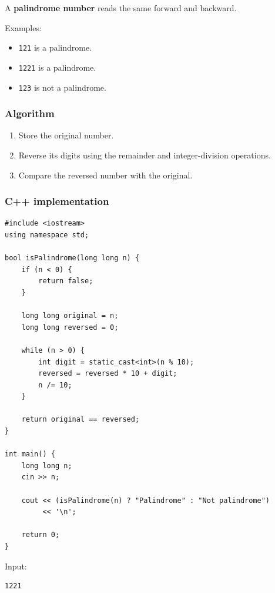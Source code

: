 A \textbf{palindrome number} reads the same forward and backward.

Examples:

\begin{itemize}
    \item \texttt{121} is a palindrome.
    \item \texttt{1221} is a palindrome.
    \item \texttt{123} is not a palindrome.
\end{itemize}

\subsubsection{Algorithm}

\begin{enumerate}
    \item Store the original number.
    \item Reverse its digits using the remainder and integer-division operations.
    \item Compare the reversed number with the original.
\end{enumerate}

\subsubsection{C++ implementation}

\begin{lstlisting}[style=cppstyle]
#include <iostream>
using namespace std;

bool isPalindrome(long long n) {
    if (n < 0) {
        return false;
    }

    long long original = n;
    long long reversed = 0;

    while (n > 0) {
        int digit = static_cast<int>(n % 10);
        reversed = reversed * 10 + digit;
        n /= 10;
    }

    return original == reversed;
}

int main() {
    long long n;
    cin >> n;

    cout << (isPalindrome(n) ? "Palindrome" : "Not palindrome")
         << '\n';

    return 0;
}
\end{lstlisting}

Input:

\begin{lstlisting}[style=pseudocode]
1221
\end{lstlisting}

